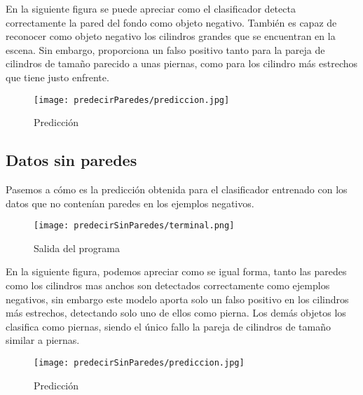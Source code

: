 En la siguiente figura se puede apreciar como el clasificador detecta correctamente la pared del fondo como objeto negativo. También es capaz de reconocer como objeto negativo los cilindros grandes que se encuentran en la escena. Sin embargo, proporciona un falso positivo tanto para la pareja de cilindros de tamaño parecido a unas piernas, como para los cilindro más estrechos que tiene justo enfrente.

\begin{figure}[H]
	\centering
	\texttt{[image: predecirParedes/prediccion.jpg]}
	\caption{Predicción}
\end{figure}

\newpage

\subsection{Datos sin paredes}
Pasemos a cómo es la predicción obtenida para el clasificador entrenado con los datos que no contenían paredes en los ejemplos negativos.
\begin{figure}[H]
	\centering
	\texttt{[image: predecirSinParedes/terminal.png]}
	\caption{Salida del programa}
\end{figure}

En la siguiente figura, podemos apreciar como se igual forma, tanto las paredes como los cilindros mas anchos son detectados correctamente como ejemplos negativos, sin embargo este modelo aporta solo un falso positivo en los cilindros más estrechos, detectando solo uno de ellos como pierna. Los demás objetos los clasifica como piernas, siendo el único fallo la pareja de cilindros de tamaño similar a piernas.

\begin{figure}[H]
	\centering
	\texttt{[image: predecirSinParedes/prediccion.jpg]}
	\caption{Predicción}
\end{figure}
